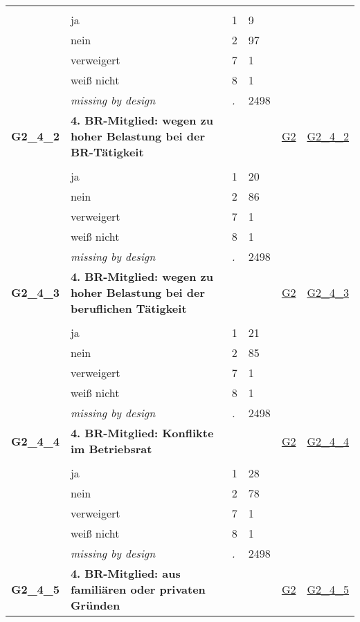 \begin{longtable}{| L{2.45cm} | L{6cm} | C{1.5cm} | R{1cm} | C{2.25cm} | C{2.25cm} |}
   &  &  &  &  &  \\ 
   & ja & 1 & 9 &  &  \\ 
   & nein & 2 & 97 &  &  \\ 
   & verweigert & 7 & 1 &  &  \\ 
   & weiß nicht & 8 & 1 &  &  \\ 
   & \textit{missing by design} & \textit{.} & 2498 &  &  \\ 
   \midrule
\textbf{G2\_4\_2}\label{var:G2:4:2} & \textbf{4. BR-Mitglied: wegen zu hoher Belastung bei der BR-Tätigkeit} &  &  & \hyperref[G2]{G2} & \hyperref[var:suf:G2:4:2]{G2\_4\_2} \\ 
   &  &  &  &  &  \\ 
   & ja & 1 & 20 &  &  \\ 
   & nein & 2 & 86 &  &  \\ 
   & verweigert & 7 & 1 &  &  \\ 
   & weiß nicht & 8 & 1 &  &  \\ 
   & \textit{missing by design} & \textit{.} & 2498 &  &  \\ 
   \midrule
\textbf{G2\_4\_3}\label{var:G2:4:3} & \textbf{4. BR-Mitglied: wegen zu hoher Belastung bei der beruflichen Tätigkeit} &  &  & \hyperref[G2]{G2} & \hyperref[var:suf:G2:4:3]{G2\_4\_3} \\ 
   &  &  &  &  &  \\ 
   & ja & 1 & 21 &  &  \\ 
   & nein & 2 & 85 &  &  \\ 
   & verweigert & 7 & 1 &  &  \\ 
   & weiß nicht & 8 & 1 &  &  \\ 
   & \textit{missing by design} & \textit{.} & 2498 &  &  \\ 
   \midrule
\textbf{G2\_4\_4}\label{var:G2:4:4} & \textbf{4. BR-Mitglied: Konflikte im Betriebsrat} &  &  & \hyperref[G2]{G2} & \hyperref[var:suf:G2:4:4]{G2\_4\_4} \\ 
   &  &  &  &  &  \\ 
   & ja & 1 & 28 &  &  \\ 
   & nein & 2 & 78 &  &  \\ 
   & verweigert & 7 & 1 &  &  \\ 
   & weiß nicht & 8 & 1 &  &  \\ 
   & \textit{missing by design} & \textit{.} & 2498 &  &  \\ 
   \midrule
\textbf{G2\_4\_5}\label{var:G2:4:5} & \textbf{4. BR-Mitglied: aus familiären oder privaten Gründen} &  &  & \hyperref[G2]{G2} & \hyperref[var:suf:G2:4:5]{G2\_4\_5} \\ 

\end{longtable}
